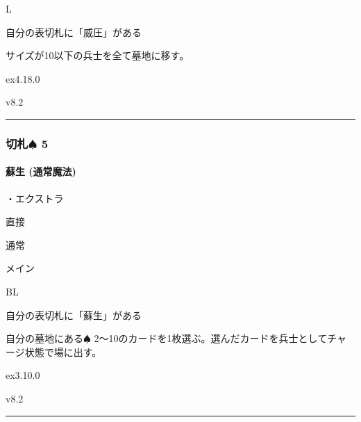\documentclass[letterpaper,10pt,dvipdfmx]{sphinxmanual}
\begin{document}
\sphinxAtStartPar
{} L

\sphinxAtStartPar
{}

\sphinxAtStartPar
自分の表切札に「威圧」がある

\sphinxAtStartPar
{}

\sphinxAtStartPar
サイズが10以下の兵士を全て墓地に移す。

\sphinxAtStartPar
{}  ex4.18.0

\sphinxAtStartPar
{}  v8.2


\bigskip\hrule\bigskip



\subsubsection{切札{\normalsize $\spadesuit$} 5}
\label{\detokenize{auto/frameActionlist:id21}}

\paragraph{蘇生 (通常魔法)}
\label{\detokenize{auto/frameActionlist:act-resurrection}}\label{\detokenize{auto/frameActionlist:id22}}
\sphinxAtStartPar
{}

\sphinxAtStartPar
・エクストラ

\sphinxAtStartPar
{} 直接

\sphinxAtStartPar
{} 通常

\sphinxAtStartPar
{} メイン

\sphinxAtStartPar
{} BL

\sphinxAtStartPar
{}

\sphinxAtStartPar
自分の表切札に「蘇生」がある

\sphinxAtStartPar
{}

\sphinxAtStartPar
自分の墓地にある{\normalsize $\spadesuit$} 2〜10のカードを1枚選ぶ。選んだカードを兵士としてチャージ状態で場に出す。

\sphinxAtStartPar
{}  ex3.10.0

\sphinxAtStartPar
{}  v8.2


\bigskip\hrule\bigskip
\end{document}
